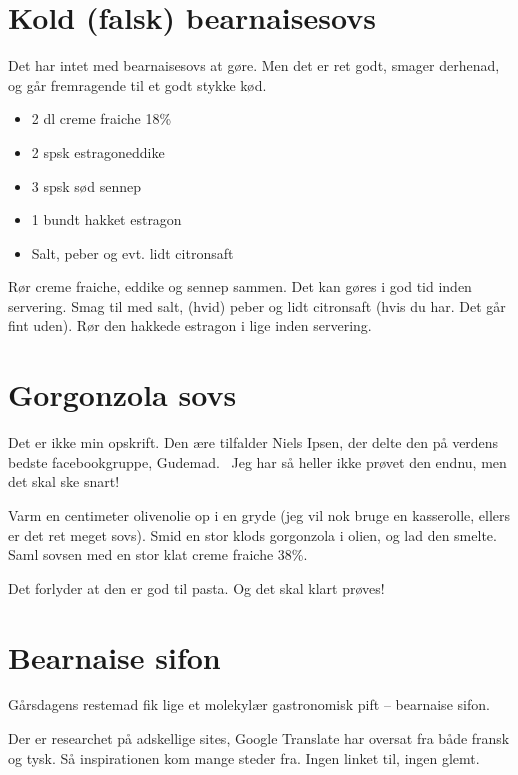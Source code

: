 \documentclass[
]{book}
\providecommand{\tightlist}{%
  \setlength{\itemsep}{0pt}\setlength{\parskip}{0pt}}
\begin{document}
\hypertarget{kold-falsk-bearnaisesovs}{%
\section{Kold (falsk) bearnaisesovs}\label{kold-falsk-bearnaisesovs}}

Det har intet med bearnaisesovs at gøre. Men det er ret godt, smager derhenad, og går fremragende til et godt stykke kød.~

\begin{itemize}
\tightlist
\item
  2 dl creme fraiche 18\%
\item
  2 spsk estragoneddike
\item
  3 spsk sød sennep
\item
  1 bundt hakket estragon
\item
  Salt, peber og evt. lidt citronsaft
\end{itemize}

Rør creme fraiche, eddike og sennep sammen. Det kan gøres i god tid inden servering. Smag til med salt, (hvid) peber og lidt citronsaft (hvis du har. Det går fint uden). Rør den hakkede estragon i lige inden servering.

\hypertarget{gorgonzola-sovs}{%
\section{Gorgonzola sovs}\label{gorgonzola-sovs}}

Det er ikke min opskrift. Den ære tilfalder Niels Ipsen, der delte den på verdens bedste facebookgruppe, Gudemad.~ Jeg har så heller ikke prøvet den endnu, men det skal ske snart!

Varm en centimeter olivenolie op i en gryde (jeg vil nok bruge en kasserolle, ellers er det ret meget sovs). Smid en stor klods gorgonzola i olien, og lad den smelte. Saml sovsen med en stor klat creme fraiche 38\%.

Det forlyder at den er god til pasta. Og det skal klart prøves!

\hypertarget{bearnaise-sifon}{%
\section{Bearnaise sifon}\label{bearnaise-sifon}}

Gårsdagens restemad fik lige et molekylær gastronomisk pift -- bearnaise sifon.~

Der er researchet på adskellige sites, Google Translate har oversat fra både fransk og tysk. Så inspirationen kom mange steder fra. Ingen linket til, ingen glemt.
\end{document}
